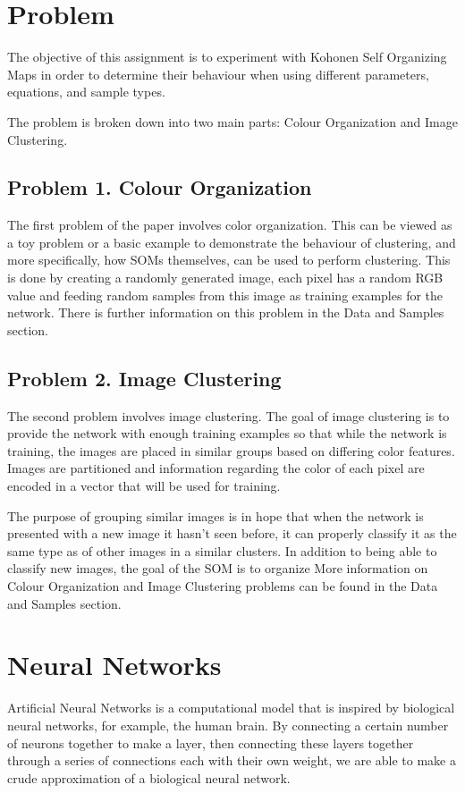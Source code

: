 \documentclass{IEEEtran}
\begin{document}
\section{Problem}
The objective of this assignment is to experiment with Kohonen Self Organizing Maps in order to determine their behaviour when using different parameters, equations, and sample types.

The problem is broken down into two main parts: Colour Organization and Image Clustering.

\subsection{Problem 1. Colour Organization}
The first problem of the paper involves color organization. This can be viewed as a toy problem or a basic example to demonstrate the behaviour of clustering, and more specifically, how SOMs themselves, can be used to perform clustering. This is done by creating a randomly generated image, each pixel has a random RGB value and feeding random samples from this image as training examples for the network. There is further information on this problem in the Data and Samples section.


\subsection{Problem 2. Image Clustering}
The second problem involves image clustering. The goal of image clustering is to provide the network with enough training examples so that while the network is training, the images are placed in similar groups based on differing color features. Images are partitioned and information regarding the color of each pixel are encoded in a vector that will be used for training.

The purpose of grouping similar images is in hope that when the network is presented with a new image it hasn't seen before, it can properly classify it as the same type as of other images in a similar clusters. In addition to being able to classify new images, the goal of the SOM is to organize 
More information on Colour Organization and Image Clustering problems can be found in the Data and Samples section.


\section{Neural Networks}
Artificial Neural Networks is a computational model that is inspired by biological neural networks, for example, the
human brain. By connecting a certain number of neurons together to make a layer, then connecting these layers together
through a series of connections each with their own weight, we are able to make a crude approximation of a biological
neural network.
\end{document}
